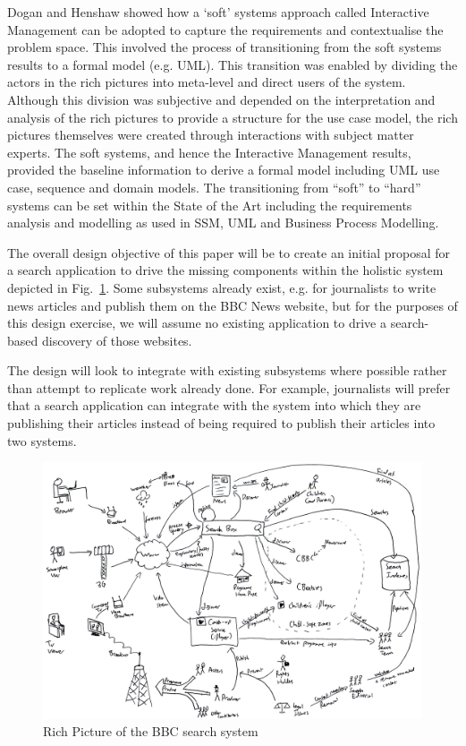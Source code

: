 \documentclass{llncs}
\begin{document}
Dogan and Henshaw\cite{dogan2010transition}
showed how a ‘soft’ systems approach called Interactive
Management can be adopted to capture the requirements and contextualise the
problem space. This involved the process of transitioning from the soft systems
results to a formal model (e.g. UML). This transition was enabled by dividing
the actors in the rich pictures into meta-level and direct users of the system.
Although this division was subjective and depended on the interpretation  and
analysis of the rich pictures to provide a structure for the use case model,
the rich pictures themselves were created through interactions with subject
matter experts. The soft systems, and hence the Interactive Management results,
provided the baseline information to derive a formal model including UML use
case, sequence and domain models. The transitioning from ``soft'' to ``hard''
systems can be set within the State of the Art including the requirements
analysis and modelling as used in SSM, UML and Business Process Modelling.

The overall design objective of this paper will be to create an initial
proposal for a
search application to drive the missing components within the holistic
system depicted in Fig.~\ref{rich-picture}. Some subsystems already
exist, e.g. for journalists to write news articles and publish them on the
BBC News website, but for the purposes of this design exercise, we will
assume no existing application to drive a search-based discovery of
those websites.

The design will look to integrate with
existing subsystems where possible rather than attempt to replicate
work already done. For example, journalists will prefer that a search
application can integrate with the system into which they are publishing
their articles instead of being required to publish their articles into
two systems.

\begin{figure}
  \begin{center}
    \includegraphics[width=\linewidth]{rich-picture.png}
  \end{center}
  \caption{Rich Picture of the BBC search system\label{rich-picture}}
\end{figure}
\end{document}
